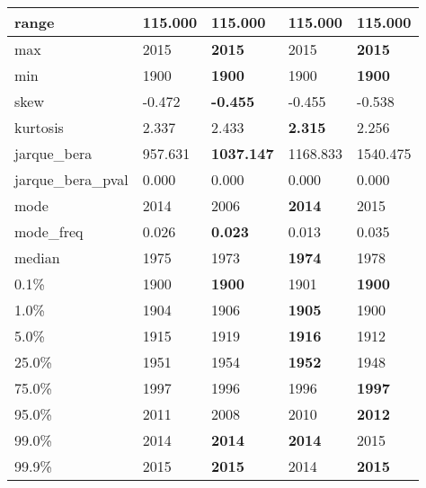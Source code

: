 \begin{table}[H]
\begin{tabular}{|l|m{10em}|m{10em}|m{10em}|m{10em}|}
\hline range & 115.000 & 115.000 & 115.000 & 115.000 \\
\hline max & 2015 & \bfseries 2015 & \cellcolor[rgb]{0.9, 0.54, 0.52} 2015 & \bfseries 2015 \\
\hline min & 1900 & \bfseries 1900 & \cellcolor[rgb]{0.9, 0.54, 0.52} 1900 & \bfseries 1900 \\
\hline skew & -0.472 & \bfseries -0.455 & -0.455 & \cellcolor[rgb]{0.9, 0.54, 0.52} -0.538 \\
\hline kurtosis & 2.337 & \cellcolor[rgb]{0.9, 0.54, 0.52} 2.433 & \bfseries 2.315 & 2.256 \\
\hline jarque\_bera & 957.631 & \bfseries 1037.147 & 1168.833 & \cellcolor[rgb]{0.9, 0.54, 0.52} 1540.475 \\
\hline jarque\_bera\_pval & 0.000 & 0.000 & 0.000 & 0.000 \\
\hline mode & 2014 & \cellcolor[rgb]{0.9, 0.54, 0.52} 2006 & \bfseries 2014 & 2015 \\
\hline mode\_freq & 0.026 & \bfseries 0.023 & \cellcolor[rgb]{0.9, 0.54, 0.52} 0.013 & 0.035 \\
\hline median & 1975 & 1973 & \bfseries 1974 & \cellcolor[rgb]{0.9, 0.54, 0.52} 1978 \\
\hline 0.1\% & 1900 & \bfseries 1900 & \cellcolor[rgb]{0.9, 0.54, 0.52} 1901 & \bfseries 1900 \\
\hline 1.0\% & 1904 & 1906 & \bfseries 1905 & \cellcolor[rgb]{0.9, 0.54, 0.52} 1900 \\
\hline 5.0\% & 1915 & \cellcolor[rgb]{0.9, 0.54, 0.52} 1919 & \bfseries 1916 & 1912 \\
\hline 25.0\% & 1951 & \cellcolor[rgb]{0.9, 0.54, 0.52} 1954 & \bfseries 1952 & \cellcolor[rgb]{0.9, 0.54, 0.52} 1948 \\
\hline 75.0\% & 1997 & \cellcolor[rgb]{0.9, 0.54, 0.52} 1996 & 1996 & \bfseries 1997 \\
\hline 95.0\% & 2011 & \cellcolor[rgb]{0.9, 0.54, 0.52} 2008 & 2010 & \bfseries 2012 \\
\hline 99.0\% & 2014 & \bfseries 2014 & \bfseries 2014 & \cellcolor[rgb]{0.9, 0.54, 0.52} 2015 \\
\hline 99.9\% & 2015 & \bfseries 2015 & \cellcolor[rgb]{0.9, 0.54, 0.52} 2014 & \bfseries 2015 \\
\hline
\end{tabular}
\end{table}
